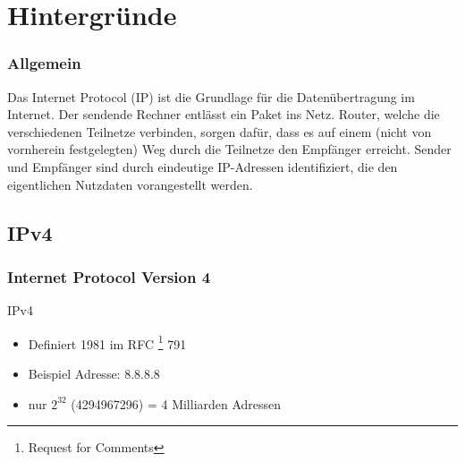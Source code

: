 \documentclass[xcolor=dvipsnames]{beamer}
\subtitle{Modul WIN11} %
\institute{AKAD Pinneberg + Stuttgart} %
\title{\Title}
\author{\Author}
\date{\today}
\begin{document}
\begin{frame}
    \titlepage
\end{frame}


\frame{\tableofcontents} 

 
\section{Hintergründe}
\begin{frame} %
 \frametitle{Allgemein}
Das Internet Protocol (IP) ist die Grundlage für die Datenübertragung im Internet. Der sendende Rechner entlässt ein Paket ins Netz. Router, welche die verschiedenen Teilnetze verbinden, sorgen dafür, dass es auf einem (nicht von vornherein festgelegten) Weg durch die Teilnetze den Empfänger erreicht. Sender und Empfänger sind durch eindeutige IP-Adressen identifiziert, die den eigentlichen Nutzdaten vorangestellt werden.
\end{frame}


\subsection{IPv4}
\begin{frame}
 \frametitle{Internet Protocol Version 4}
  \begin{block}{IPv4}
	  \begin{itemize}
	  	\item Definiert 1981 im RFC \footnote{Request for Comments} 791
	  	\item Beispiel Adresse: 8.8.8.8
  		\item nur $2^{32}$ (4294967296) = 4 Milliarden Adressen
	  \end{itemize}
  \end{block}
\end{frame}
\end{document}
